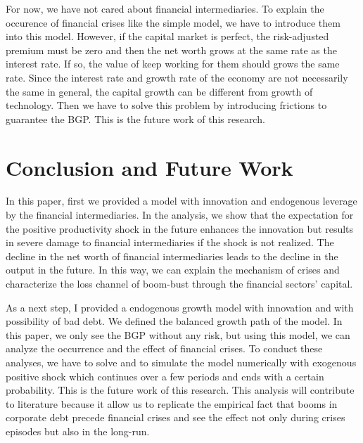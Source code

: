 \documentclass[a4paper,12pt]{article}
\begin{document}
For now, we have not cared about financial intermediaries. To explain the occurence of financial crises like the simple model, we have to introduce them into this model. However, if the capital market is perfect, the risk-adjusted premium must be zero and then the net worth grows at the same rate as the interest rate. If so, the value of keep working for them should grows the same rate. Since the interest rate and growth rate of the economy are not necessarily the same in general, the capital growth can be different from growth of technology. Then we have to solve this problem by introducing frictions to guarantee the BGP. This is the future work of this research.

\section{Conclusion and Future Work}
  
In this paper, first we provided a model with innovation and endogenous leverage by the financial intermediaries. In the analysis, we show that the expectation for the positive productivity shock in the future enhances the innovation but  results in severe damage to financial intermediaries if the shock is not realized. The decline in the net worth of financial intermediaries leads to the decline in the output in the future. In this way, we can explain the mechanism of crises and characterize the loss channel of boom-bust through the financial sectors' capital.\par
As a next step, I provided a endogenous growth model with innovation and with possibility of bad debt. We defined the balanced growth path of the model. In this paper, we only see the BGP without any risk, but using this model, we can analyze the occurrence and the effect of financial crises. To conduct these analyses, we have to solve and to simulate the model numerically with exogenous positive shock which continues over a few periods and ends with a certain probability. This is the future work of this research. This analysis will contribute to literature because it allow us to replicate the empirical fact that booms in corporate debt precede financial crises and see the effect not only during crises episodes but also in the long-run.

\clearpage
\end{document}

